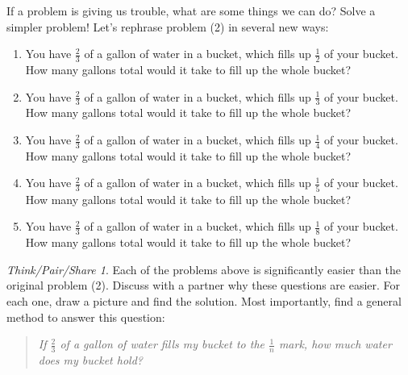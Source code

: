 \documentclass[10pt, reqno]{amsart}
\theoremstyle{remark}
\newtheorem*{thinkpair*}{Think/Pair/Share}
\theoremstyle{definition}
\numberwithin{equation}{section}  %
\begin{document}
If a problem is giving us trouble, what are some things we can do?  Solve a simpler problem!
Let's rephrase problem (2) in several new ways:
\begin{enumerate}[(2a)]
\item
You have $\frac 2 3$ of a gallon of water in a bucket, which fills up $\frac 1 2$ of your bucket.  How many gallons total would it take to fill up the whole bucket?\\

\item
You have $\frac 2 3$ of a gallon of water in a bucket, which fills up $\frac 1 3$ of your bucket.  How many gallons total would it take to fill up the whole bucket?\\

\item
You have $\frac 2 3$ of a gallon of water in a bucket, which fills up $\frac 1 4$ of your bucket.  How many gallons total would it take to fill up the whole bucket?\\

\item
You have $\frac 2 3$ of a gallon of water in a bucket, which fills up $\frac 1 5$ of your bucket.  How many gallons total would it take to fill up the whole bucket?\\

\item
 You have $\frac 2 3$ of a gallon of water in a bucket, which fills up $\frac 1 8$ of your bucket.  How many gallons total would it take to fill up the whole bucket?\\

\end{enumerate}

\begin{thinkpair*}
Each of the problems above is significantly easier than the original problem (2).  Discuss with a partner why these questions are easier.  For each one, draw a picture and find the solution.  Most importantly, find a general method to answer this question:

\begin{quotation}
\emph{
If $\frac 2 3$ of a gallon  of water fills my bucket to the $\frac 1 n$ mark, how much water does my bucket hold?}
\end{quotation}
\end{thinkpair*}
\end{document}
